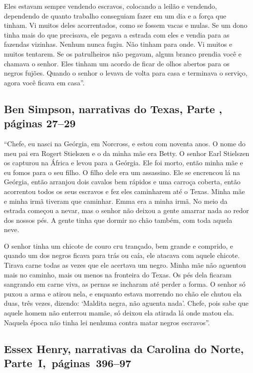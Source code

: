 Eles estavam sempre vendendo escravos, colocando a leilão e vendendo,
dependendo de quanto trabalho conseguiam fazer em um dia e a força que
tinham. Vi muitos deles acorrentados, como se fossem vacas e mulas. Se
um dono tinha mais do que precisava, ele pegava a estrada com eles e
vendia para as fazendas vizinhas. Nenhum nunca fugiu. Não tinham para
onde. Vi muitos e muitos tentarem. Se os patrulheiros não pegavam, algum
branco prendia você e chamava o senhor. Eles tinham um acordo de ficar
de olhos abertos para os negros fujões. Quando o senhor o levava de
volta para casa e terminava o serviço, agora você ficava em casa''.

\subsection{Ben Simpson, narrativas do Texas, Parte , páginas 27--29}
\label{ref240}

``Chefe, eu nasci na Geórgia, em Norcross, e estou com noventa anos. O
nome do meu pai era Rogert Stielszen e o da minha mãe era Betty. O
senhor Earl Stielszen os capturou na África e levou para a Geórgia. Ele
foi morto, então minha mãe e eu fomos para o seu filho. O filho dele era
um assassino. Ele se encrencou lá na Geórgia, então arranjou dois
cavalos bem rápidos e uma carroça coberta, então acorrentou todos os
seus escravos e fez eles caminharem até o Texas. Minha mãe e minha irmã
tiveram que caminhar. Emma era a minha irmã. No meio da estrada começou
a nevar, mas o senhor não deixou a gente amarrar nada ao redor dos
nossos pés. A gente tinha que dormir no chão também, com toda aquela
neve.

O senhor tinha um chicote de couro cru trançado, bem grande e comprido,
e quando um dos negros ficava para trás ou caía, ele atacava com aquele
chicote. Tirava carne todas as vezes que ele acertava um negro. Minha
mãe não aguentou mais no caminho, mais ou menos na fronteira do Texas.
Os pés dela ficaram sangrando em carne viva, as pernas se incharam até
perder a forma. O senhor só puxou a arma e atirou nela, e enquanto
estava morrendo no chão ele chutou ela duas, três vezes, dizendo:
`Maldita negra, não aguenta nada'. Chefe, pois sabe que aquele homem não
enterrou mamãe, só deixou ela atirada lá onde matou ela. Naquela época
não tinha lei nenhuma contra matar negros escravos''.

\subsection{Essex Henry, narrativas da Carolina do Norte, Parte~I,~páginas~396--97}
\label{ref136}

